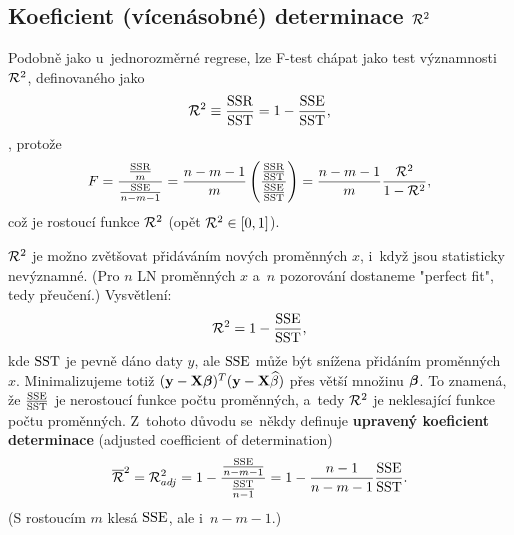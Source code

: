  \subsection*{Koeficient (vícenásobné) determinace $\mathcal{R}^2$ }
 Podobně jako u~jednorozměrné regrese, lze F-test chápat jako test významnosti $\mathcal{R}^2$, definovaného jako
 $$ \mathcal{R}^2\equiv \frac{\mathrm{SSR}}{\mathrm{SST}} = 1-\frac{\mathrm{SSE}}{\mathrm{SST}}, $$
, protože
 $$ F = \frac{\frac{\mathrm{SSR}}{m}}{\frac{\mathrm{SSE}}{n-m-1}} = \frac{n-m-1}{m}\left(\frac{\frac{\mathrm{SSR}}{\mathrm{SST}}}{\frac{\mathrm{SSE}}{\mathrm{SST}}} \right) = \frac{n-m-1}{m}\frac{\mathcal{R}^2}{1-\mathcal{R}^2}, $$
 což je rostoucí funkce $\mathcal{R}^2$ (opět $\mathcal{R}^2\in[0,1]$).
 \begin{remark}
 	 $\mathcal{R}^2$ je možno zvětšovat přidáváním nových proměnných $x$, i~když jsou statisticky nevýznamné. (Pro $n$ LN proměnných $x$ a~$n$ pozorování dostaneme "perfect fit", tedy přeučení.) Vysvětlení:
 	 $$ \mathcal{R}^2 = 1-\frac{\mathrm{SSE}}{\mathrm{SST}}, $$
 	kde $\mathrm{SST}$ je pevně dáno daty $y$, ale $\mathrm{SSE}$ může být snížena přidáním proměnných $x$. Minimalizujeme totiž $(\textbf{y}-\textbf{X}\boldsymbol{\beta})^T(\textbf{y}-\textbf{X}\widehat{\beta})$ přes větší množinu $\boldsymbol{\beta}$. To znamená, že $\frac{\mathrm{SSE}}{\mathrm{SST}}$ je nerostoucí funkce počtu proměnných, a~tedy $\mathcal{R}^2$ je neklesající funkce počtu proměnných. Z~tohoto důvodu se~někdy definuje \textbf{upravený koeficient determinace} (adjusted coefficient of determination)
 	 $$ \overline{\mathcal{R}}^2 = \mathcal{R}_{adj}^2 = 1-\frac{\frac{\mathrm{SSE}}{n-m-1}}{\frac{\mathrm{SST}}{n-1}} = 1-\frac{n-1}{n-m-1}\frac{\mathrm{SSE}}{\mathrm{SST}}. $$
 	(S rostoucím $m$ klesá $\mathrm{SSE}$, ale i~$n-m-1$.)
 \end{remark}
